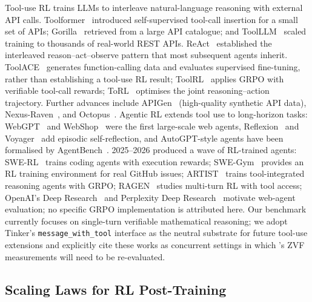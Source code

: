 Tool-use RL trains LLMs to interleave natural-language reasoning with external
API calls. Toolformer~\cite{schick2023toolformer} introduced self-supervised
tool-call insertion for a small set of APIs; Gorilla~\cite{patil2023gorilla}
retrieved from a large API catalogue; and ToolLLM~\cite{qin2024toolllm} scaled
training to thousands of real-world REST APIs. ReAct~\cite{yao2023react}
established the interleaved reason--act--observe pattern that most subsequent
agents inherit. ToolACE~\cite{liu2024toolace} generates function-calling data and evaluates
supervised fine-tuning, rather than establishing a tool-use RL result; ToolRL~\cite{qian2025toolrl} applies GRPO
with verifiable tool-call rewards; ToRL~\cite{li2025torl} optimises the joint
reasoning--action trajectory. Further advances include
APIGen~\cite{lin2024apigen} (high-quality synthetic API data),
Nexus-Raven~\cite{nexusflow2024nexusraven}, and
Octopus~\cite{chen2024octopus}. Agentic RL extends tool use to long-horizon
tasks: WebGPT~\cite{nakano2021webgpt} and
WebShop~\cite{yao2022webshop} were the first large-scale web agents,
Reflexion~\cite{shinn2023reflexion} and Voyager~\cite{wang2023voyager} add
episodic self-reflection, and AutoGPT-style agents have been formalised by
AgentBench~\cite{liu2024agentbench}. 2025--2026 produced a wave of RL-trained
agents: SWE-RL~\cite{wei2025swerl} trains coding agents with execution
rewards; SWE-Gym~\cite{pan2025swegym} provides an RL training environment for
real GitHub issues; ARTIST~\cite{singh2025artist} trains tool-integrated
reasoning agents with GRPO; RAGEN~\cite{wang2025ragen} studies multi-turn
RL with tool access; OpenAI's Deep Research~\cite{openai2025deepresearch}
and Perplexity Deep Research~\cite{perplexity2025deepresearch} motivate
web-agent evaluation; no specific GRPO implementation is attributed here. Our benchmark currently focuses
on single-turn verifiable mathematical reasoning; we adopt Tinker's
\texttt{message\_with\_tool} interface as the neutral substrate for future
tool-use extensions and explicitly cite these works as concurrent settings in
which \ours{}'s ZVF measurements will need to be re-evaluated.

\subsection{Scaling Laws for RL Post-Training}
\label{sec:related:scaling}

